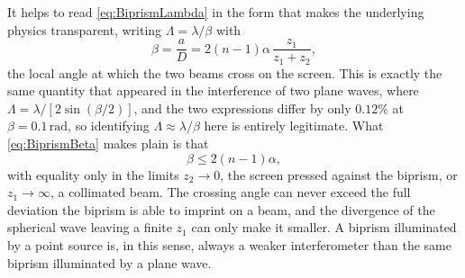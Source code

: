         It helps to read \ref{eq:BiprismLambda} in the form that makes the underlying physics transparent, writing $\Lambda = \lambda/\beta$ with
        \begin{equation}\label{eq:BiprismBeta}
            \beta = \frac{a}{D} = 2(n-1)\alpha\,\frac{z_1}{z_1+z_2},
        \end{equation}
        the local angle at which the two beams cross on the screen. This is exactly the same quantity that appeared in the interference of two plane waves, where $\Lambda = \lambda/[2\sin(\beta/2)]$, and the two expressions differ by only $0.12\%$ at $\beta = 0.1\,\text{rad}$, so identifying $\Lambda\approx\lambda/\beta$ here is entirely legitimate. What \ref{eq:BiprismBeta} makes plain is that
        \begin{equation}
            \beta \leq 2(n-1)\alpha,
        \end{equation}
        with equality only in the limits $z_2 \to 0$, the screen pressed against the biprism, or $z_1\to\infty$, a collimated beam. The crossing angle can never exceed the full deviation the biprism is able to imprint on a beam, and the divergence of the spherical wave leaving a finite $z_1$ can only make it smaller. A biprism illuminated by a point source is, in this sense, always a weaker interferometer than the same biprism illuminated by a plane wave.


